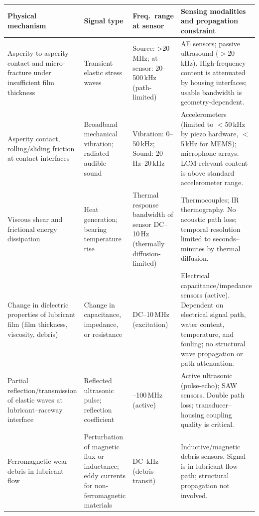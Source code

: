 \begin{table}[H]
\scriptsize
\centering
\begin{tabularx}{\linewidth}{| >{\raggedright\arraybackslash}p{2.3cm} | >{\raggedright\arraybackslash}p{2.2cm} | >{\raggedright\arraybackslash}p{1.9cm} | X |}
\hline
\textbf{Physical mechanism} & \textbf{Signal type} & \textbf{Freq.\ range at sensor} & \textbf{Sensing modalities and propagation constraint} \\
\hline
Asperity-to-asperity contact and micro-fracture under insufficient film thickness & Transient elastic stress waves & Source: >20\,MHz; at sensor: 20--500\,kHz (path-limited) & AE sensors; passive ultrasound ($>$20\,kHz). High-frequency content is attenuated by housing interfaces; usable bandwidth is geometry-dependent. \\
\hline
Asperity contact, rolling/sliding friction at contact interfaces & Broadband mechanical vibration; radiated audible sound & Vibration: 0--50\,kHz; Sound: 20\,Hz--20\,kHz & Accelerometers (limited to $<$50\,kHz by piezo hardware, $<$5\,kHz for MEMS); microphone arrays. LCM-relevant content is above standard accelerometer range. \\
\hline
Viscous shear and frictional energy dissipation & Heat generation; bearing temperature rise & Thermal response bandwidth of sensor DC--10\,Hz (thermally diffusion-limited) & Thermocouples; IR thermography. No acoustic path loss; temporal resolution limited to seconds--minutes by thermal diffusion. \\
\hline
Change in dielectric properties of lubricant film (film thickness, viscosity, debris) & Change in capacitance, impedance, or resistance & DC--10\,MHz (excitation) & Electrical capacitance/impedance sensors (active). Dependent on electrical
signal path, water content, temperature, and fouling; no structural wave propagation or path attenuation.  \\
\hline
Partial reflection/transmission of elastic waves at lubricant--raceway interface & Reflected ultrasonic pulse; reflection coefficient & 1--100\,MHz (active) & Active ultrasonic (pulse-echo); SAW sensors. Double path loss; transducer--housing coupling quality is critical. \\
\hline
Ferromagnetic wear debris in lubricant flow & Perturbation of magnetic flux or inductance; eddy currents for non-ferromagnetic materials & DC--kHz (debris transit) & Inductive/magnetic debris sensors. Signal is in lubricant flow path; structural propagation not involved. \\

\end{tabularx}
\end{table}
